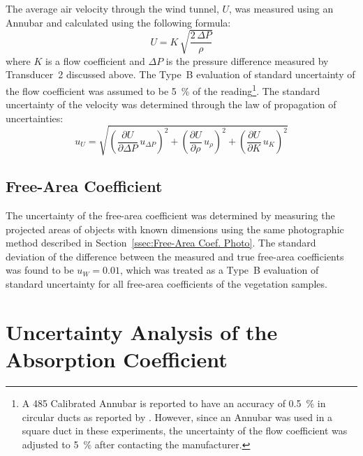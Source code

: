 \documentclass[12pt]{article}
\begin{document}
The average air velocity through the wind tunnel, $U$, was measured using an Annubar and calculated using the following formula:
\begin{equation}
\label{eq:Velocity}
U = K \, \sqrt{\frac{2 \, \Delta P}{\rho}}
\end{equation}
where $K$ is a flow coefficient and $\Delta P$ is the pressure difference measured by Transducer~2 discussed above. The Type~B evaluation of standard uncertainty of the flow coefficient was assumed to be 5~\% of the reading\footnote{A 485 Calibrated Annubar is reported to have an accuracy of 0.5~\% in circular ducts as reported by \cite{Annubar}. However, since an Annubar was used in a square duct in these experiments, the uncertainty of the flow coefficient was adjusted to 5~\% after contacting the manufacturer.}. The standard uncertainty of the velocity was determined through the law of propagation of uncertainties:
\begin{equation}
\label{eq:Velocityuncertainty}
u_{\scriptscriptstyle U} = \sqrt{{\left( \frac{\partial U}{\partial \Delta P}\,u_{\scriptscriptstyle \Delta P} \right) }^2+{\left(\frac{\partial U}{\partial \rho}\,u_{\scriptscriptstyle \rho}\right)}^2+{\left(\frac{\partial U}{\partial K}\,u_{\scriptscriptstyle K}\right)}^2}
\end{equation}

\subsection{Free-Area Coefficient }
\label{ssec:FAACUncertainty}

The uncertainty of the free-area coefficient was determined by measuring the projected areas of objects with known dimensions using the same photographic method described in Section~\ref{ssec:Free-Area Coef. Photo}. The standard deviation of the difference between the measured and true free-area coefficients was found to be $u_{\scriptscriptstyle W}=0.01$, which was treated as a Type~B evaluation of standard uncertainty for all free-area coefficients of the vegetation samples.

\section{Uncertainty Analysis of the Absorption Coefficient} \label{sec:UncertaintyAbsCoef}
\end{document}
